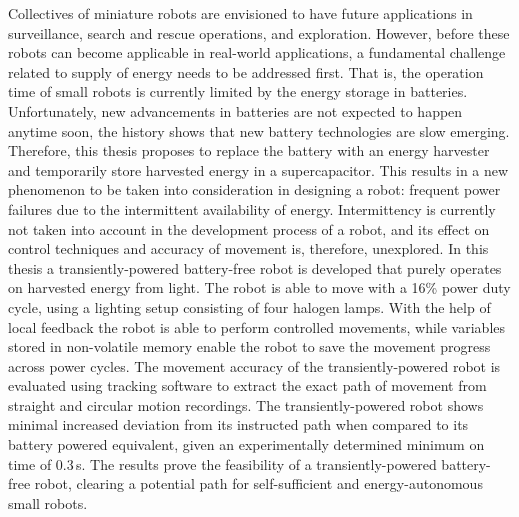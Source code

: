 Collectives of miniature robots are envisioned to have future applications in surveillance, search and rescue operations, and exploration. 
However, before these robots can become applicable in real-world applications, a fundamental challenge related to supply of energy needs to be addressed first.
That is, the operation time of small robots is currently limited by the energy storage in batteries.
Unfortunately, new advancements in batteries are not expected to happen anytime soon, the history shows that new battery technologies are slow emerging.
Therefore, this thesis proposes to replace the battery with an energy harvester and temporarily store harvested energy in a supercapacitor.
This results in a new phenomenon to be taken into consideration in designing a robot: frequent power failures due to the intermittent availability of energy.
Intermittency is currently not taken into account in the development process of a robot, and its effect on control techniques and accuracy of movement is, therefore, unexplored.
In this thesis a transiently-powered battery-free robot is developed that purely operates on harvested energy from light.
The robot is able to move with a 16\% power duty cycle, using a lighting setup consisting of four halogen lamps.
With the help of local feedback the robot is able to perform controlled movements, while variables stored in non-volatile memory enable the robot to save the movement progress across power cycles.
The movement accuracy of the transiently-powered robot is evaluated using tracking software to extract the exact path of movement from straight and circular motion recordings.	
The transiently-powered robot shows minimal increased deviation from its instructed path when compared to its battery powered equivalent, given an experimentally determined minimum on time of 0.3\,s.
The results prove the feasibility of a transiently-powered battery-free robot, clearing a potential path for self-sufficient and energy-autonomous small robots.